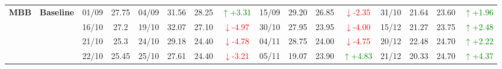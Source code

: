 \documentclass{ieeeaccess}
\begin{document}
{\begin{longtable}{llcc|cccc|cccc|cccc}
\multirow{4}{*}{\textbf{MBB}}
& \textbf{Baseline}
& 01/09 & 27.75 & 04/09 & 31.56 & 28.25 & \textcolor{green}{\(\uparrow\)+3.31} & 15/09 & 29.20 & 26.85 & \textcolor{red}{\(\downarrow\)-2.35} & 31/10 & 21.64 & 23.60 & \textcolor{green}{\(\uparrow\)+1.96} \\
& & 16/10 & 27.2 & 19/10 & 32.07 & 27.10 & \textcolor{red}{\(\downarrow\)-4.97} & 30/10 & 27.95 & 23.95 & \textcolor{red}{\(\downarrow\)-4.00} & 15/12 & 21.27 & 23.75 & \textcolor{green}{\(\uparrow\)+2.48} \\
& & 21/10 & 25.3 & 24/10 & 29.18 & 24.40 & \textcolor{red}{\(\downarrow\)-4.78} & 04/11 & 28.75 & 24.00 & \textcolor{red}{\(\downarrow\)-4.75} & 20/12 & 22.48 & 24.70 & \textcolor{green}{\(\uparrow\)+2.22} \\
& & 22/10 & 25.45 & 25/10 & 27.61 & 24.40 & \textcolor{red}{\(\downarrow\)-3.21} & 05/11 & 19.07 & 23.90 & \textcolor{green}{\(\uparrow\)+4.83} & 21/12 & 20.33 & 24.70 & \textcolor{green}{\(\uparrow\)+4.37} \\
\midrule

\end{longtable}
}

\clearpage
\onecolumn
\end{document}
